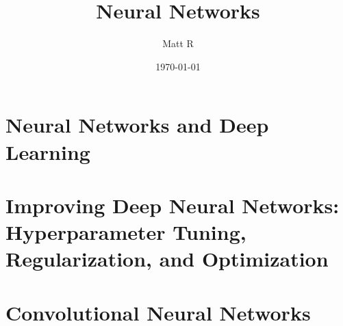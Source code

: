\documentclass[12pt]{article}
\title{Neural Networks}
\author{Matt R}
\date{\today}
\numberwithin{equation}{section}%
\let\oldpart\part
\renewcommand\part{\newpage\oldpart}
\begin{document}
	\maketitle
	\tableofcontents
	
	\part{Neural Networks and Deep Learning}
		
		
		
		
	\part{Improving Deep Neural Networks: Hyperparameter Tuning, Regularization, and Optimization}
		
		
		
		
		
		
		
		
	\part{Convolutional Neural Networks}


	\begin{comment}
	\begin{appendices}
		\section{utils.py}
		
		\section{activators.py}
		

	\end{appendices}
	\end{comment}


	
	
\end{document}
